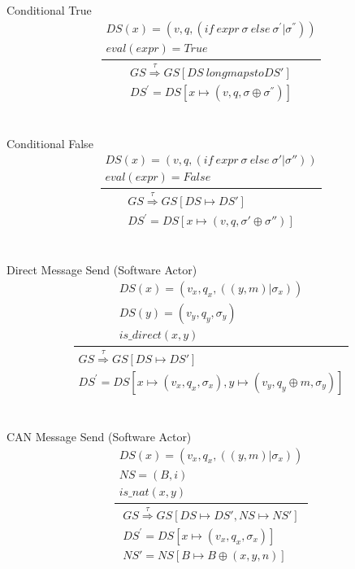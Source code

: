 \documentclass[]{article}
\begin{document}
\\\\
Conditional True
\begin{equation}
\frac
{
	\begin{gathered}
	DS(x)=(v,q,(if \ expr \ \sigma \ else \ \sigma ^{'} |\sigma ^{''})) \\
	eval(expr) = True
	\end{gathered}
}
{
	\begin{gathered}
	GS\overset{\tau}{\Rightarrow}GS[DS\ longmapsto DS'] \\
	 DS^{'}=DS[x \longmapsto(v,q,\sigma \oplus \sigma ^{''})]
	\end{gathered}
}
\end{equation}
\\\\
Conditional False
\begin{equation}\label{ConditionalFalse}
\frac
{
	\begin{gathered}
	DS(x)=(v,q,(if \ expr \ \sigma \ else \ \sigma ' |\sigma'')) \\
	eval(expr) = False
	\end{gathered}
}
{
	\begin{gathered}
	GS\overset{\tau}{\Rightarrow}GS[DS \longmapsto DS'] \\
	DS^{'}=DS[x \longmapsto(v,q,\sigma' \oplus \sigma'')]
	\end{gathered}
}
\end{equation}
\\\\
Direct Message Send (Software Actor)
\begin{equation}
\frac
{
	\begin{gathered}
	DS(x)=(v_x,q_x,((y,m) |\sigma_x)) \\
	DS(y) = (v_y,q_y,\sigma_y) \\
	is\_direct(x,y)
	\end{gathered}
}
{
	\begin{gathered}
	GS\overset{\tau}{\Rightarrow}GS[DS\longmapsto DS'] \\
	DS^{'}=DS[x \longmapsto(v_x,q_x,\sigma_x),y\longmapsto(v_y,q_y \oplus m,\sigma_y) ]
	\end{gathered}
}
\end{equation}
\\\\
CAN Message Send (Software Actor)
\begin{equation}
\frac
{
	\begin{gathered}
	DS(x)=(v_x,q_x,((y,m) |\sigma_x)) \\
	NS = (B,i) \\
	is\_nat(x,y)
	\end{gathered}
}
{
	\begin{gathered}
	GS\overset{\tau}{\Rightarrow}GS[DS\longmapsto DS', NS\longmapsto NS'] \\
	DS^{'}=DS[x \longmapsto(v_x,q_x,\sigma_x)]\\
	NS' = NS[B\longmapsto B \oplus (x,y,n)]
	\end{gathered}
}
\end{equation}
\end{document}
